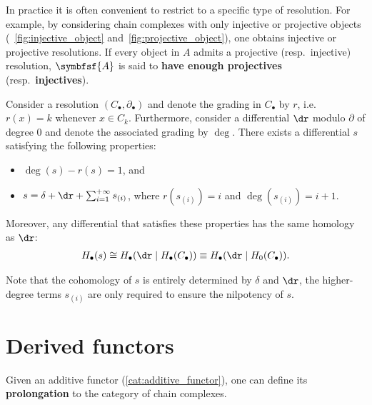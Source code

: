 	In practice it is often convenient to restrict to a specific type of resolution. For example, by considering chain complexes with only injective or projective objects (~\ref{fig:injective_object} and~\ref{fig:projective_object}), one obtains injective or projective resolutions. If every object in $A$ admits a projective (resp.~injective) resolution, $\symbfsf{A}$ is said to \textbf{have enough projectives} (resp.~\textbf{injectives}).

    \begin{theorem}\label{homalg:homological_perturbation}
        Consider a resolution $(C_\bullet,\partial_\bullet)$ and denote the grading in $C_\bullet$ by $r$, i.e.~$r(x)=k$ whenever $x\in C_k$. Furthermore, consider a differential $\dr$ modulo $\partial$ of degree 0 and denote the associated grading by $\deg$. There exists a differential $s$ satisfying the following properties:
        \begin{itemize}
            \item $\deg(s) - r(s) = 1$, and
            \item $s = \delta + \dr + \sum_{i=1}^{+\infty}s_{(i)}$, where $r(s_{(i)})=i$ and $\deg(s_{(i)}) = i+1$.
        \end{itemize}
        Moreover, any differential that satisfies these properties has the same homology as $\dr$:
        \begin{gather}
            H_\bullet(s)\cong H_\bullet(\dr\mid H_\bullet(C_\bullet))\equiv H_\bullet(\dr\mid H_0(C_\bullet)).
        \end{gather}
    \end{theorem}
	\begin{remark}
		Note that the cohomology of $s$ is entirely determined by $\delta$ and $\dr$, the higher-degree terms $s_{(i)}$ are only required to ensure the nilpotency of $s$.
	\end{remark}

\section{Derived functors}

	Given an additive functor (\cref{cat:additive_functor}), one can define its \textbf{prolongation} to the category of chain complexes.

